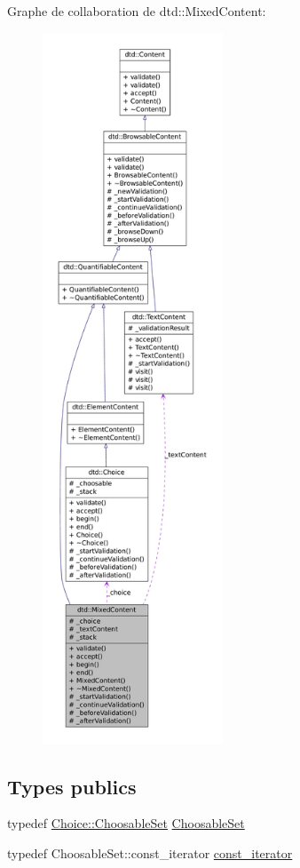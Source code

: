 Graphe de collaboration de dtd::MixedContent:\nopagebreak
\begin{figure}[H]
\begin{center}
\leavevmode
\includegraphics[height=600pt]{classdtd_1_1_mixed_content__coll__graph}
\end{center}
\end{figure}
\subsection*{Types publics}
\begin{DoxyCompactItemize}
\item 
typedef \hyperlink{classdtd_1_1_choice_af9629ca325eb99da3f274b2ad3dc2060}{Choice::ChoosableSet} \hyperlink{classdtd_1_1_mixed_content_ab8f0c26935279ce90ebb5bb22b244088}{ChoosableSet}
\item 
typedef ChoosableSet::const\_\-iterator \hyperlink{classdtd_1_1_mixed_content_a801684f467b642e9e2de6297585ccf7b}{const\_\-iterator}
\end{DoxyCompactItemize}
